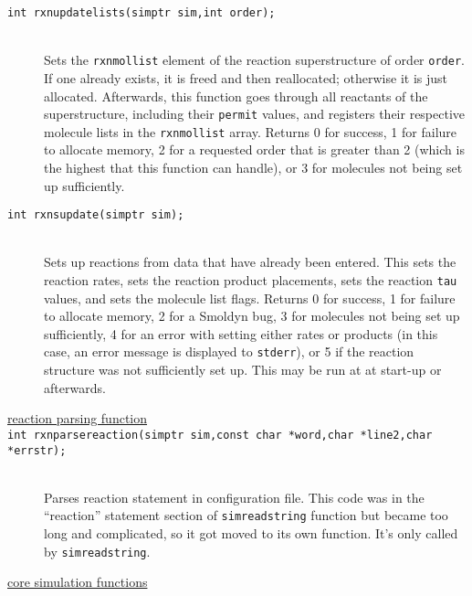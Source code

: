 \documentclass {scrbook}
\newcommand {\ttt} {\texttt}
\begin{document}
\begin{description}
\item[\ttt{int rxnupdatelists(simptr sim,int order);}]
\hfill \\
Sets the \ttt{rxnmollist} element of the reaction superstructure of order \ttt{order}. If one already exists, it is freed and then reallocated; otherwise it is just allocated. Afterwards, this function goes through all reactants of the superstructure, including their \ttt{permit} values, and registers their respective molecule lists in the \ttt{rxnmollist} array. Returns 0 for success, 1 for failure to allocate memory, 2 for a requested order that is greater than 2 (which is the highest that this function can handle), or 3 for molecules not being set up sufficiently.

\item[\ttt{int rxnsupdate(simptr sim);}]
\hfill \\
Sets up reactions from data that have already been entered. This sets the reaction rates, sets the reaction product placements, sets the reaction \ttt{tau} values, and sets the molecule list flags. Returns 0 for success, 1 for failure to allocate memory, 2 for a Smoldyn bug, 3 for molecules not being set up sufficiently, 4 for an error with setting either rates or products (in this case, an error message is displayed to \ttt{stderr}), or 5 if the reaction structure was not sufficiently set up. This may be run at at start-up or afterwards.

\item[\underline{reaction parsing function}]

\item[\ttt{int rxnparsereaction(simptr sim,const char *word,char *line2,char *errstr);}]
\hfill \\
Parses reaction statement in configuration file. This code was in the ``reaction'' statement section of \ttt{simreadstring} function but became too long and complicated, so it got moved to its own function. It's only called by \ttt{simreadstring}.

\item[\underline{core simulation functions}]


\end{description}
\end{document}
